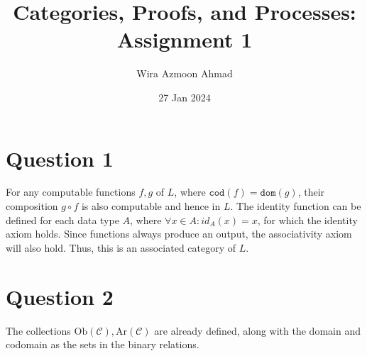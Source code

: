 \documentclass[11pt]{article} %
\title{Categories, Proofs, and Processes: \\Assignment 1}
\author{Wira Azmoon Ahmad}
\date{27 Jan 2024}
\theoremstyle{definition}
\begin{document}
%
\maketitle




\section*{Question 1}
\addtocounter{section}{1}
For any computable functions $f,g$ of $L$, where $\texttt{cod}(f)=\texttt{dom}(g)$, 
their composition $g\circ f$ is also computable and hence in $L$.
The identity function can be defined for each data type $A$, where $\forall x\in A: id_A(x)=x$,
for which the identity axiom holds.
Since functions always produce an output, the associativity axiom will also hold.
Thus, this is an associated category of $L$.

\section*{Question 2}
\addtocounter{section}{1}
The collections $\text{Ob}(\mathcal{C}),\text{Ar}(\mathcal{C})$ are already defined,
along with the domain and codomain as the sets in the binary relations.
\end{document}
